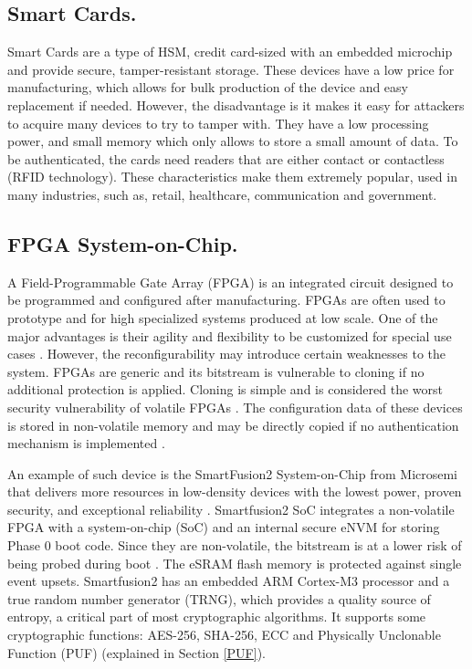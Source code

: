 \subsection*{Smart Cards.} \label{computing:smartcards}
Smart Cards are a type of HSM, credit card-sized with an embedded microchip and provide secure, tamper-resistant storage. These devices have a low price for manufacturing, which allows for bulk production of the device and easy replacement if needed. However, the disadvantage is it makes it easy for attackers to acquire many devices to try to tamper with. They have a low processing power, and small memory which only allows to store a small amount of data. To be authenticated, the cards need readers that are either contact or contactless (RFID technology). These characteristics make them extremely popular, used in many industries, such as, retail, healthcare, communication and government.

\subsection {FPGA System-on-Chip.} \label{computing:smartfusion}
A Field-Programmable Gate Array (FPGA) is an integrated circuit designed to be programmed and configured after manufacturing. FPGAs are often used to prototype and for high specialized systems produced at low scale. One of the major advantages is their agility and flexibility to be customized for special use cases \cite{cyberphysicalsystems}. However, the reconfigurability may introduce certain weaknesses to the system. FPGAs are generic and its bitstream is vulnerable to cloning if no additional protection is applied. Cloning is simple and is considered the worst security vulnerability of volatile FPGAs \cite{fpgasurvey}. The configuration data of these devices is stored in non-volatile memory and may be directly copied if no authentication mechanism is implemented \cite{drimer2007authentication}.

An example of such device is the SmartFusion2 System-on-Chip from Microsemi that delivers more resources in low-density devices with the lowest power, proven security, and exceptional reliability \cite{smartfusion2soc}. Smartfusion2 SoC integrates a non-volatile FPGA with a system-on-chip (SoC) and an internal secure eNVM for storing Phase 0 boot code. Since they are non-volatile, the bitstream is at a lower risk of being probed during boot \cite{parrinha2017flexible}. The eSRAM flash memory is protected against single event upsets. Smartfusion2 has an embedded ARM Cortex-M3 processor and a true random number generator (TRNG), which provides a quality source of entropy, a critical part of most cryptographic algorithms. It supports some cryptographic functions: AES-256, SHA-256, ECC and Physically Unclonable Function (PUF) (explained in Section \ref{PUF}).


